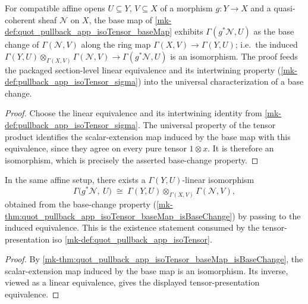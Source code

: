 \begin{theorem}\label{mk-thm:quot_pullback_app_isoTensor_baseMap_isBaseChange}
  \leanok

  For compatible affine opens \(U \subseteq Y\), \(V \subseteq X\) of a
  morphism \(g : Y \to X\) and a quasi-coherent sheaf \(\mathcal{N}\) on
  \(X\), the base map of \ref{mk-def:quot_pullback_app_isoTensor_baseMap}
  exhibits \(\Gamma(g^* \mathcal{N}, U)\) as the base change of
  \(\Gamma(\mathcal{N}, V)\) along the ring map
  \(\Gamma(X, V) \to \Gamma(Y, U)\); i.e.\ the induced
  \(\Gamma(Y, U) \otimes_{\Gamma(X, V)} \Gamma(\mathcal{N}, V)
   \to \Gamma(g^* \mathcal{N}, U)\) is an isomorphism. The proof feeds the
  packaged section-level linear equivalence and its intertwining property
  (\ref{mk-def:pullback_app_isoTensor_sigma}) into the universal
  characterization of a base change.
\end{theorem}
\begin{proof}
  Choose the linear equivalence and its intertwining identity from
  \ref{mk-def:pullback_app_isoTensor_sigma}. The universal property of the
  tensor product identifies the scalar-extension map induced by the base
  map with this equivalence, since they agree on every pure tensor
  \(1\otimes x\). It is therefore an isomorphism, which is precisely the
  asserted base-change property.
\end{proof}

\begin{theorem}\label{mk-thm:quot_pullback_app_isoTensor_isBaseChange}
  \leanok

  In the same affine setup, there exists a \(\Gamma(Y, U)\)-linear
  isomorphism
  \[
    \Gamma\bigl(g^* \mathcal{N},\ U\bigr)
    \;\cong\;
    \Gamma(Y, U) \otimes_{\Gamma(X, V)} \Gamma(\mathcal{N}, V),
  \]
  obtained from the base-change property
  (\ref{mk-thm:quot_pullback_app_isoTensor_baseMap_isBaseChange}) by passing to
  the induced equivalence. This is the existence statement consumed by the
  tensor-presentation iso \ref{mk-def:quot_pullback_app_isoTensor}.
\end{theorem}
\begin{proof}
  By \ref{mk-thm:quot_pullback_app_isoTensor_baseMap_isBaseChange}, the
  scalar-extension map induced by the base map is an isomorphism. Its
  inverse, viewed as a linear equivalence, gives the displayed
  tensor-presentation equivalence.
\end{proof}

